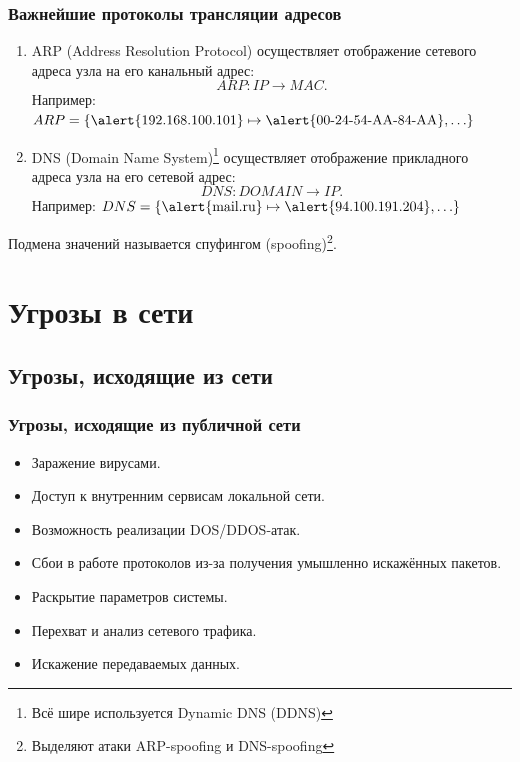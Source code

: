 \begin{frame}
    \frametitle{Важнейшие протоколы трансляции адресов}
    
    \begin{enumerate}
        \item ARP (Address Resolution Protocol) осуществляет отображение \alert{сетевого} адреса узла на его \alert{канальный} адрес:
        \[ARP:IP\to MAC.\]
        Например: $ARP=\{\alert{\text{192.168.100.101}}\mapsto \alert{\text{00-24-54-AA-84-AA}},\ldots\}$
        
        \item DNS (Domain Name System)\footnote{Всё шире используется Dynamic DNS (DDNS)} осуществляет отображение \alert{прикладного} адреса узла на его \alert{сетевой} адрес:
        \[DNS:DOMAIN\to IP.\]
        Например: $DNS=\{\alert{\text{mail.ru}}\mapsto \alert{\text{94.100.191.204}},\ldots\}$
    \end{enumerate}
    Подмена значений называется \alert{спуфингом} (spoofing)\footnote{Выделяют атаки ARP-spoofing и DNS-spoofing}.
\end{frame}


\section{Угрозы в сети}


\subsection{Угрозы, исходящие из сети}


\begin{frame}
    \frametitle{Угрозы, исходящие из публичной сети}
    
    \begin{itemize}
        \item Заражение вирусами.
        \item Доступ к внутренним сервисам локальной сети.
        \item Возможность реализации DOS/DDOS-атак.
        \item Сбои в работе протоколов из-за получения умышленно искажённых пакетов.
        \item Раскрытие параметров системы.
        \item Перехват и анализ сетевого трафика.
        \item Искажение передаваемых данных.
    \end{itemize}
\end{frame}


